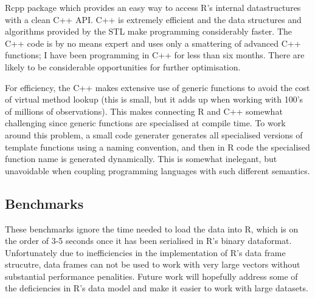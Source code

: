 \documentclass[journal]{vgtc}                %
\begin{document}
Rcpp package which provides an easy way to access R's internal datastructures with a clean C++ API.  C++ is extremely efficient and the data structures and algorithms provided by the STL make programming considerably faster.  The C++ code is by no means expert and uses only a smattering of advanced C++ functions; I have been programming in C++ for less than six months. There are likely to be considerable opportunities for further optimisation.

For efficiency, the C++ makes extensive use of generic functions to avoid the cost of virtual method lookup (this is small, but it adds up when working with 100's of millions of observations).  This makes connecting R and C++ somewhat challenging since generic functions are specialised at compile time. To work around this problem, a small code generater generates all specialised versions of template functions using a naming convention, and then in R code the specialised function name is generated dynamically.  This is somewhat inelegant, but unavoidable when coupling programming languages with such different semantics.

\subsection{Benchmarks}
\label{sub:benchmarks}

These benchmarks ignore the time needed to load the data into R, which is on the order of 3-5 seconds once it has been serialised in R's binary dataformat.  Unfortunately due to inefficiencies in the implementation of R's data frame strucutre, data frames can not be used to work with very large vectors without substantial performance penalities. Future work will hopefully address some of the deficiencies in R's data model and make it easier to work with large datasets.
\end{document}
